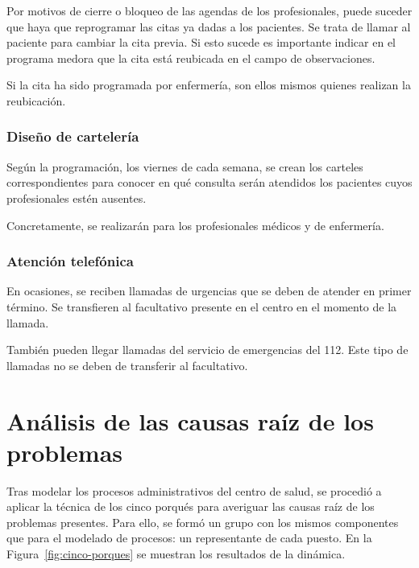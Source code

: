Por motivos de cierre o bloqueo de las agendas de los profesionales, puede suceder que haya que reprogramar las citas ya dadas a los pacientes.
Se trata de llamar al paciente para cambiar la cita previa. Si esto sucede es importante indicar en el programa \Gls{medora} que la cita está reubicada en el campo de observaciones.

Si la cita ha sido programada por enfermería, son ellos mismos quienes realizan la reubicación.

\subsubsection{Diseño de cartelería}

Según la programación, los viernes de cada semana, se crean los carteles correspondientes para conocer en qué consulta serán atendidos los pacientes cuyos profesionales estén ausentes.

Concretamente, se realizarán para los profesionales médicos y de enfermería.

\subsubsection{Atención telefónica}

En ocasiones, se reciben llamadas de urgencias que se deben de atender en primer término. Se transfieren al facultativo presente en el centro en el momento de la llamada.

También pueden llegar llamadas del servicio de emergencias del 112. Este tipo de llamadas no se deben de transferir al facultativo.

\section{Análisis de las causas raíz de los problemas}

Tras modelar los procesos administrativos del centro de salud, se procedió a aplicar la técnica de los cinco porqués para averiguar las causas raíz de los problemas presentes.
Para ello, se formó un grupo con los mismos componentes que para el modelado de procesos: un representante de cada puesto. En la Figura~\ref{fig:cinco-porques} se muestran los resultados de la dinámica.

